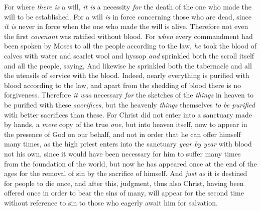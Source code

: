\begin{biblechapter}
\verse For where \textit{there is} a will, \textit{it is} a necessity \textit{for} the death of the one who made the will to be established.
\verse For a will \textit{is} in force concerning those who are dead, since \textit{it is} never in force when the one who made the will is alive.
\verse Therefore not even the first \textit{covenant} was ratified without blood.
\verse For \textit{when} every commandment had been spoken by Moses to all the people according to the law, \textit{he} took the blood of calves with water and scarlet wool and hyssop \textit{and} sprinkled both the scroll itself and all the people,
\verse saying,
\verse And likewise he sprinkled both the tabernacle and all the utensils of service with the blood.
\verse Indeed, nearly everything is purified with blood according to the law, and apart from the shedding of blood there is no forgiveness.
\verse Therefore \textit{it was} necessary \textit{for} the sketches of the \textit{things} in heaven to be purified with these \textit{sacrifices}, but the heavenly \textit{things} themselves \textit{to be purified} with better sacrifices than these.
\verse For Christ did not enter into a sanctuary made by hands, a \textit{mere} copy of the true \textit{one}, but into heaven itself, now to appear in the presence of God on our behalf,
\verse and not in order that he can offer himself many times, as the high priest enters into the sanctuary \textit{year by year} with blood not his own,
\verse since it would have been necessary for him to suffer many times from the foundation of the world, but now he has appeared once at the end of the ages for the removal of sin by the sacrifice of himself.
\verse And \textit{just as} it is destined for people to die once, and after this, judgment,
\verse thus also Christ, having been offered once in order to bear the sins of many, will appear for the second time without reference to sin to those who eagerly await him for salvation.
\end{biblechapter}


